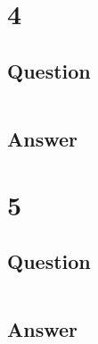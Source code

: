 \documentclass[letterpaper,11pt]{article}
\newcommand*{\srcPath}{../src}%
\begin{document}
% 

\clearpage


\section*{4}

\subsection*{Question}

\begin{verbatim}

\end{verbatim}

\subsection*{Answer}




\clearpage


\section*{5}

\subsection*{Question}

\begin{verbatim}

\end{verbatim}

\subsection*{Answer}


\clearpage


\clearpage


\end{document}
